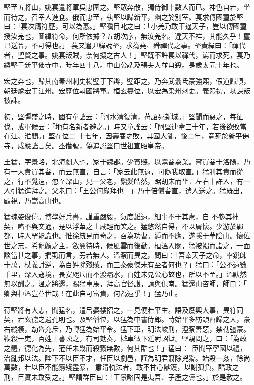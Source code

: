\begin{pinyinscope}
 堅至五將山，姚萇遣將軍吳忠圍之。堅眾奔散，獨侍御十數人而已。神色自若，坐而待之，召宰人進食。俄而忠至，執堅以歸新平，幽之於別室。萇求傳國璽於堅曰：「萇次膺符歷，可以為惠。」堅瞋目叱之曰：「小羌乃敢干逼天子，豈以傳國璽授汝羌也，圖緯符命，何所依據？五胡次序，無汝羌名。違天不祥，其能久乎！璽已送晉，不可得也。」
 萇又遣尹緯說堅，求為堯、舜禪代之事。堅責緯曰：「禪代者，聖賢之事。姚萇叛賊，奈何擬之古人！」堅既不許萇以禪代，罵而求死，萇乃縊堅于新平佛寺中，時年四十八。中山公詵及張夫人並自殺。是歲太元十年也。



 宏之奔也，歸其南秦州刺史楊璧于下辯，璧距之，乃奔武翥氐豪強熙，假道歸順，朝廷處宏于江州。宏歷位輔國將軍。桓玄篡位，以宏為梁州刺史。義熙初，以謀叛被誅。



 初，堅彊盛之時，國有童謠云：「河水清復清，苻詔死新城。」堅聞而惡之，每征伐，戒軍候云：「地有名新者避之。」時又童謠云：「阿堅連牽三十年，若後欲敗當在江、淮間。」堅在位二
 十七年，因壽春之敗，其國大亂，後二年，竟死於新平佛寺，咸應謠言矣。丕僭號，偽追謚堅曰世祖宣昭皇帝。



 王猛，字景略，北海劇人也，家于魏郡。少貧賤，以鬻畚為業。嘗貨畚于洛陽，乃有一人貴買其畚，而云無直，自言：「家去此無遠，可隨我取直。」猛利其貴而從之，行不覺遠，忽至深山，見一父老，鬚髮皓然，踞胡床而坐，左右十許人，有一人引猛進拜之。父老曰：「王公何緣拜也！」乃十倍償畚直，遣人送之。猛既出，顧視，乃嵩高山也。



 猛瑰姿俊偉。博學好兵書，謹重嚴毅，氣度雄遠，細事不干其慮，自
 不參其神契，略不與交通，是以浮華之士咸輕而笑之。猛悠然自得，不以屑懷。少游於鄴都，時人罕能識也。惟徐統見而奇之，召為功曹。遁而不應，遂隱于華陰山。懷佐世之志，希龍顏之主，斂翼待時，候風雲而後動。桓溫入關，猛被褐而詣之，一面談當世之事，捫虱而言，旁若無人。溫察而異之，問曰：「吾奉天子之命，率銳師十萬，杖義討逆，為百姓除殘賊，而三秦豪傑未有至者何也？」猛曰：「公不遠數千里，深入寇境，長安咫尺而不渡灞水，百姓未見公心故也，所以不至。」溫默然無以酬之。溫之將還，賜猛車馬，拜高官督護，請與俱南。猛還山咨師，師曰：「
 卿與桓溫豈並世哉！在此自可富貴，何為遠乎！」猛乃止。



 苻堅將有大志，聞猛名，遣呂婆樓招之，一見便若平生。語及廢興大事，異符同契，若玄德之遇孔明也。及堅僭位，以猛為中書侍郎。時始平多枋頭西歸之人，豪右縱橫，劫盜充斥，乃轉猛為始平令。猛下車，明法峻刑，澄察善惡，禁勒彊豪。鞭殺一吏，百姓上書訟之，有司劾奏，檻車徵下廷尉詔獄。堅親問之，曰：「為政之體，德化為先，蒞任未幾而殺戮無數，何其酷也！」猛曰：「臣聞宰寧國以禮，治亂邦以法。陛下不以臣不才，任臣以劇邑，謹為明君翦除兇猾。始殺一姦，餘尚萬數，若以臣不能窮殘盡暴，
 肅清軌法者，敢不甘心鼎鑊，以謝孤負。酷政之刑，臣實未敢受之。」堅謂群臣曰：「王景略固是夷吾、子產之儔也。」於是赦之。




\end{pinyinscope}
